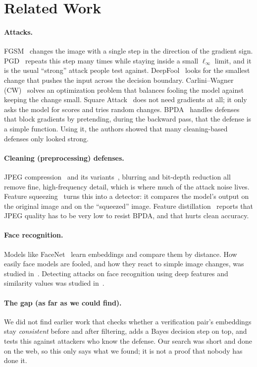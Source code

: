 \section{Related Work}
\paragraph{Attacks.} FGSM~\cite{goodfellow2015fgsm} changes the image with a single step in the direction of the gradient sign. PGD~\cite{madry2018pgd} repeats this step many times while staying inside a small $\ell_\infty$ limit, and it is the usual ``strong'' attack people test against. DeepFool~\cite{moosavi2016deepfool} looks for the smallest change that pushes the input across the decision boundary. Carlini--Wagner (CW)~\cite{carlini2017cw} solves an optimization problem that balances fooling the model against keeping the change small. Square Attack~\cite{andriushchenko2020square} does not need gradients at all; it only asks the model for scores and tries random changes. BPDA~\cite{athalye2018obfuscated} handles defenses that block gradients by pretending, during the backward pass, that the defense is a simple function. Using it, the authors showed that many cleaning-based defenses only looked strong.

\paragraph{Cleaning (preprocessing) defenses.} JPEG compression~\cite{dziugaite2016jpeg} and its variants~\cite{das2018shield,liu2019featdist}, blurring and bit-depth reduction all remove fine, high-frequency detail, which is where much of the attack noise lives. Feature squeezing~\cite{xu2018squeeze} turns this into a detector: it compares the model's output on the original image and on the ``squeezed'' image. Feature distillation~\cite{liu2019featdist} reports that JPEG quality has to be very low to resist BPDA, and that hurts clean accuracy.

\paragraph{Face recognition.} Models like FaceNet~\cite{schroff2015facenet} learn embeddings and compare them by distance. How easily face models are fooled, and how they react to simple image changes, was studied in~\cite{goswami2018unravelling}. Detecting attacks on face recognition using deep features and similarity values was studied in~\cite{massoli2021detection}.

\paragraph{The gap (as far as we could find).} We did not find earlier work that checks whether a verification pair's embeddings stay \emph{consistent} before and after filtering, adds a Bayes decision step on top, and tests this against attackers who know the defense. Our search was short and done on the web, so this only says what we found; it is not a proof that nobody has done it.
